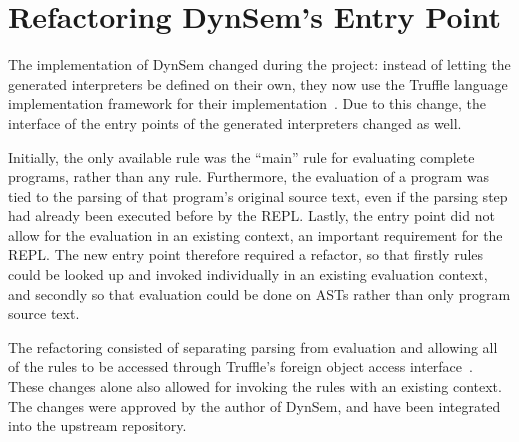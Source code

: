 \section{Refactoring DynSem's Entry Point}
\label{sec:dynsem-refactor}
The implementation of DynSem changed during the project:
instead of letting the generated interpreters be defined on their own, they now
use the Truffle language implementation framework for their
implementation~\cite{Humer14}. Due to this change, the interface of the entry
points of the generated interpreters changed as well.

Initially, the only available rule was the ``main'' rule for evaluating complete
programs, rather than any rule. Furthermore, the evaluation of a program was
tied to the parsing of that program's original source text, even if the parsing
step had already been executed before by the REPL. Lastly, the entry point did
not allow for the evaluation in an existing context, an important
requirement for the REPL. The new entry point therefore required a refactor, so
that firstly rules could be looked up and invoked individually in an existing
evaluation context, and secondly so that evaluation could be done on ASTs rather
than only program source text.

The refactoring consisted of separating parsing from evaluation and allowing all
of the rules to be accessed through Truffle's foreign object access
interface~\cite{Grimmer15}. These changes alone also allowed for invoking the
rules with an existing context. The changes were approved by the author of
DynSem, and have been integrated into the upstream repository.

